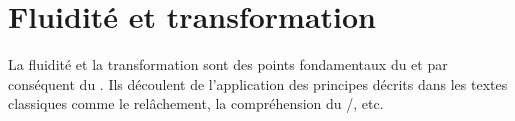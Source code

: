 \chapter{Fluidité et transformation}\label{ch:transformation}

La fluidité et la transformation sont des points fondamentaux du \Taijiquan{} et par conséquent du \Taijijian{}.
Ils découlent de l'application des principes décrits dans les textes classiques comme le relâchement, la compréhension du \Yin/\Yang{}, etc. 
